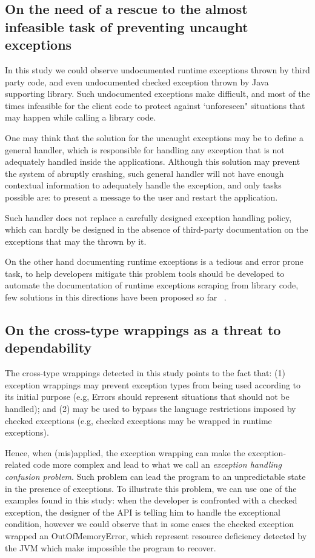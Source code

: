 \documentclass[conference]{IEEEtran}
\begin{document}
\subsection{On the need of a rescue to the almost infeasible task of preventing uncaught exceptions}
In this study we could observe undocumented runtime exceptions thrown by third party code,
and even undocumented checked exception thrown by Java supporting library.
Such undocumented exceptions make difficult, and most of the times infeasible
for the client code to protect against `unforeseen" situations that may happen 
while calling a library code.

One may think that the solution for the uncaught exceptions 
may be to define a general handler, 
which is responsible for handling any exception that is not
adequately handled inside the applications. Although this 
solution may prevent  the system of abruptly crashing,
 such general handler will not have enough
contextual information to adequately handle the exception, 
and only tasks possible are: to present a message to the user
 and restart the application.

Such handler does not replace a carefully designed exception 
handling policy, which can hardly be designed in the absence of 
third-party documentation on the exceptions that
may the thrown by it.

On the other hand documenting runtime exceptions is a tedious and error prone task, to help developers
mitigate this problem tools should be developed to automate the documentation of runtime exceptions
scraping from library code, few solutions in this directions have been proposed so far ~\cite{van2005combining}. 

\subsection{On the cross-type wrappings as a threat to dependability}
The cross-type wrappings detected in this study points to the fact that: (1) exception 
wrappings may prevent exception types from being used according to its initial purpose
 (e.g, Errors should represent situations that should not be handled); and (2) may  be used
 to bypass the language restrictions imposed by checked exceptions  (e.g,
 checked exceptions may be wrapped in runtime exceptions).

Hence, when (mis)applied, the exception wrapping can make the exception-related code
 more complex and lead to what we call an \emph{exception handling confusion problem}.
Such problem can lead the program to
an unpredictable state in the presence of exceptions. To illustrate this problem, we can use
 one of the examples found in this study: when the developer is 
confronted with a checked exception, the designer of the API is telling him 
to handle the exceptional condition, however we could observe that in some cases the 
checked exception wrapped an OutOfMemoryError, which represent resource deficiency detected 
by the JVM which make impossible the program to recover. 
\end{document}
